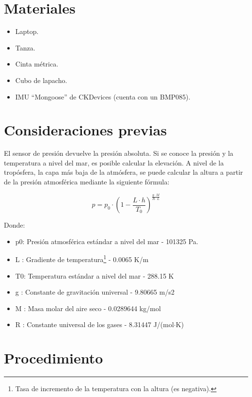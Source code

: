 \documentclass[main]{subfiles}
\begin{document}
\newpage
\section{Materiales}
\label{sec:materiales}

\begin{itemize}
\item Laptop.
\item Tanza.
\item Cinta métrica.
\item Cubo de lapacho.
\item IMU ``Mongoose'' de CKDevices (cuenta con un BMP085).
\end{itemize}

\section{Consideraciones previas}
\label{consideraciones}

El sensor de presión devuelve la presión absoluta. Si se conoce la presión y la temperatura a nivel del mar, es posible calcular la elevación. A nivel de la tropósfera, la capa más baja de la atmósfera, se puede calcular la altura a partir de la presión atmosférica mediante la siguiente fórmula\cite{bib:alt-press}:

\begin{equation}
  \label{eq:press-alt}
  p = p_0 \cdot \left(1 - \frac{L \cdot h}{T_0} \right)^\frac{g \cdot M}{R \cdot L}
\end{equation}

Donde:
\begin{itemize}
\item p0: 	Presión atmosférica estándar a nivel del mar -	101325 Pa.
\item L :	Gradiente de temperatura\footnote{Tasa de incremento de la temperatura con la altura (es negativa).} -	0.0065 K/m
\item T0:	Temperatura estándar a nivel del mar -	288.15 K
\item g :	Constante de gravitación universal -	9.80665 m/s2
\item M :	Masa molar del aire seco -	0.0289644 kg/mol
\item R :	Constante universal de los gases - 	8.31447 J/(mol$\cdot$K)
\end{itemize}


\section{Procedimiento}
\label{sec:procedimiento}
\end{document}
